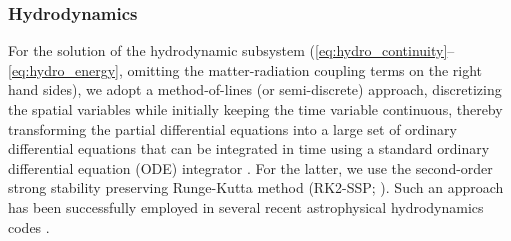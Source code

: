 \documentclass[fleqn,usenatbib]{mnras}
\providecommand{\DIFaddbegin}{} %
\newcommand{\DIFaddincludegraphics}[2][]{{\color{blue}\fbox{\DIFOincludegraphics[#1]{#2}}}} %
\DeclareRobustCommand{\DIFaddbegin}{\DIFOaddbegin \let\includegraphics\DIFaddincludegraphics} %
\begin{document}
\subsubsection{Hydrodynamics}
\label{sssec:hydro}
For the solution of the hydrodynamic subsystem (\autoref{eq:hydro_continuity}--\autoref{eq:hydro_energy}, omitting the matter-radiation coupling terms on the right hand sides), we adopt a method-of-lines (or semi-discrete) approach, discretizing the spatial variables while initially keeping the time variable continuous, thereby transforming the partial differential equations into a large set of ordinary differential equations that can be integrated in time using a standard ordinary differential equation (ODE) integrator \citep{Jameson_1981}. For the latter, we use the second-order strong stability preserving Runge-Kutta method (RK2-SSP; \citealt{Shu_1988}). Such an approach has been successfully employed in several recent astrophysical hydrodynamics codes \citep{Skinner_2019,Stone_2020}.
\DIFaddbegin 
\end{document}
